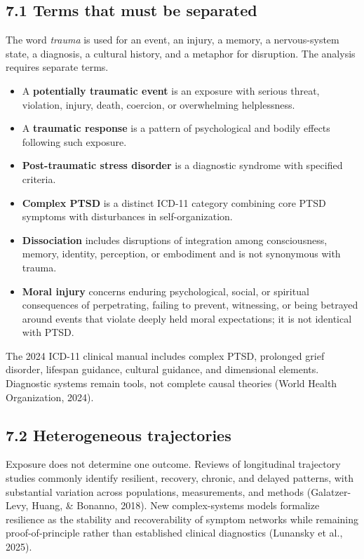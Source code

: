\documentclass[
  11pt,
]{article}
\providecommand{\tightlist}{%
  \setlength{\itemsep}{0pt}\setlength{\parskip}{0pt}}
\begin{document}
\subsection{7.1 Terms that must be
separated}\label{terms-that-must-be-separated}

The word \emph{trauma} is used for an event, an injury, a memory, a
nervous-system state, a diagnosis, a cultural history, and a metaphor
for disruption. The analysis requires separate terms.

\begin{itemize}
\tightlist
\item
  A \textbf{potentially traumatic event} is an exposure with serious
  threat, violation, injury, death, coercion, or overwhelming
  helplessness.
\item
  A \textbf{traumatic response} is a pattern of psychological and bodily
  effects following such exposure.
\item
  \textbf{Post-traumatic stress disorder} is a diagnostic syndrome with
  specified criteria.
\item
  \textbf{Complex PTSD} is a distinct ICD-11 category combining core
  PTSD symptoms with disturbances in self-organization.
\item
  \textbf{Dissociation} includes disruptions of integration among
  consciousness, memory, identity, perception, or embodiment and is not
  synonymous with trauma.
\item
  \textbf{Moral injury} concerns enduring psychological, social, or
  spiritual consequences of perpetrating, failing to prevent,
  witnessing, or being betrayed around events that violate deeply held
  moral expectations; it is not identical with PTSD.
\end{itemize}

The 2024 ICD-11 clinical manual includes complex PTSD, prolonged grief
disorder, lifespan guidance, cultural guidance, and dimensional
elements. Diagnostic systems remain tools, not complete causal theories
(World Health Organization, 2024).

\subsection{7.2 Heterogeneous
trajectories}\label{heterogeneous-trajectories}

Exposure does not determine one outcome. Reviews of longitudinal
trajectory studies commonly identify resilient, recovery, chronic, and
delayed patterns, with substantial variation across populations,
measurements, and methods (Galatzer-Levy, Huang, \& Bonanno, 2018). New
complex-systems models formalize resilience as the stability and
recoverability of symptom networks while remaining proof-of-principle
rather than established clinical diagnostics (Lunansky et al., 2025).
\end{document}
